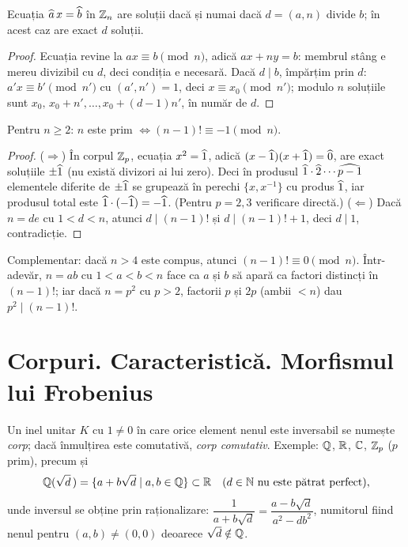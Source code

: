 \begin{propozitie}\label{prop:liniara}
Ecuația $\widehat{a}\,x=\widehat{b}$ în $\mathbb{Z}_n$ are soluții dacă și numai dacă $d=(a,n)$ divide $b$; în acest caz are exact $d$ soluții.
\end{propozitie}

\begin{proof}
Ecuația revine la $ax\equiv b\pmod n$, adică $ax+ny=b$: membrul stâng e mereu divizibil cu $d$, deci condiția e necesară. Dacă $d\mid b$, împărțim prin $d$: $a'x\equiv b'\pmod{n'}$ cu $(a',n')=1$, deci $x\equiv x_0\pmod{n'}$; modulo $n$ soluțiile sunt $x_0,\,x_0+n',\dots,x_0+(d-1)n'$, în număr de $d$.
\end{proof}

\begin{teorema}[Wilson]\label{teo:wilson}
Pentru $n\ge2$: $n$ este prim $\iff(n-1)!\equiv-1\pmod n$.
\end{teorema}

\begin{proof}
($\Rightarrow$) În corpul $\mathbb{Z}_p$, ecuația $x^2=\widehat{1}$, adică $(x-\widehat{1})(x+\widehat{1})=\widehat{0}$, are exact soluțiile $\pm\widehat{1}$ (nu există divizori ai lui zero). Deci în produsul $\widehat{1}\cdot\widehat{2}\cdots\widehat{p-1}$ elementele diferite de $\pm\widehat{1}$ se grupează în perechi $\{x,x^{-1}\}$ cu produs $\widehat{1}$, iar produsul total este $\widehat{1}\cdot(-\widehat{1})=-\widehat{1}$. (Pentru $p=2,3$ verificare directă.)
($\Leftarrow$) Dacă $n=de$ cu $1<d<n$, atunci $d\mid(n-1)!$ și $d\mid(n-1)!+1$, deci $d\mid1$, contradicție.
\end{proof}

\begin{observatie}
Complementar: dacă $n>4$ este compus, atunci $(n-1)!\equiv0\pmod n$. Într-adevăr, $n=ab$ cu $1<a<b<n$ face ca $a$ și $b$ să apară ca factori distincți în $(n-1)!$; iar dacă $n=p^2$ cu $p>2$, factorii $p$ și $2p$ (ambii $<n$) dau $p^2\mid(n-1)!$.
\end{observatie}

\section{Corpuri. Caracteristică. Morfismul lui Frobenius}

\begin{definitie}
Un inel unitar $K$ cu $1\neq0$ în care orice element nenul este inversabil se numește \emph{corp}; dacă înmulțirea este comutativă, \emph{corp comutativ}. Exemple: $\mathbb{Q}$, $\mathbb{R}$, $\mathbb{C}$, $\mathbb{Z}_p$ ($p$ prim), precum și
\[
\mathbb{Q}(\sqrt d\,)=\{a+b\sqrt d\mid a,b\in\mathbb{Q}\}\subset\mathbb{R}\quad(d\in\mathbb{N}\text{ nu este pătrat perfect}),
\]
unde inversul se obține prin raționalizare: $\dfrac1{a+b\sqrt d}=\dfrac{a-b\sqrt d}{a^2-db^2}$, numitorul fiind nenul pentru $(a,b)\neq(0,0)$ deoarece $\sqrt d\notin\mathbb{Q}$.
\end{definitie}

